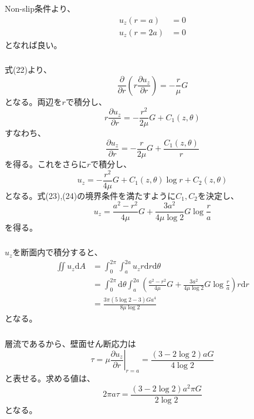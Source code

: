 \documentclass[a4paper]{jsarticle}
\begin{document}
\subsubsection{}
Non-slip条件より、
\begin{align}
  u_z (r = a) &= 0 \\
  u_z (r = 2a) &= 0
\end{align}
となれば良い。

\subsubsection{}
式(22)より、
\begin{equation}
  \frac{\partial}{\partial r} \left(r \frac{\partial u_z}{\partial r}\right)
  = -\frac{r}{\mu} G
\end{equation}
となる。両辺を$r$で積分し、
\begin{equation}
  r \frac{\partial u_z}{\partial r}
  = -\frac{r^2}{2\mu} G + C_1(z, \theta)
\end{equation}
すなわち、
\begin{equation}
  \frac{\partial u_z}{\partial r}
  = -\frac{r}{2 \mu} G + \frac{C_1(z, \theta)}{r}
\end{equation}
を得る。これをさらに$r$で積分し、
\begin{equation}
  u_z = -\frac{r^2}{4 \mu} G + C_1(z, \theta) \log r + C_2(z, \theta)
\end{equation}
となる。式(23),(24)の境界条件を満たすように$C_1, C_2$を決定し、
\begin{equation}
  u_z = \frac{a^2 - r^2}{4 \mu} G + \frac{3 a^2}{4 \mu \log 2} G \log \frac{r}{a}
\end{equation}
を得る。

\subsubsection{}
$u_z$を断面内で積分すると、
\begin{equation}
  \begin{aligned}
    \iint u_z \mathrm{d} A &=
    \int_0^{2 \pi} \int_a^{2a} u_z r \mathrm{d} r \mathrm{d} \theta \\
    &= \int_0^{2 \pi} \mathrm{d} \theta
    \int_a^{2a} \left(\frac{a^2 - r^2}{4 \mu} G + \frac{3 a^2}{4 \mu \log 2} G \log \frac{r}{a}\right) r \mathrm{d} r \\
    &= \frac{3 \pi (5 \log 2 - 3) G a^4}{8 \mu \log 2}
  \end{aligned}
\end{equation}
となる。

\subsubsection{}
層流であるから、壁面せん断応力は
\begin{equation}
  \tau = \mu \left.\frac{\partial u_z}{\partial r}\right|_{r=a}
  = \frac{(3 - 2 \log 2) a G}{4 \log 2}
\end{equation}
と表せる。求める値は、
\begin{equation}
  2 \pi a \tau = \frac{(3 - 2 \log 2) a^2 \pi G}{2 \log 2}
\end{equation}
となる。
\end{document}
